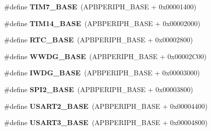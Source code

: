 \begin{DoxyCompactItemize}
\item 
\mbox{\label{group___peripheral__memory__map_ga0ebf54364c6a2be6eb19ded6b18b6387}} 
\#define {\bfseries T\+I\+M7\+\_\+\+B\+A\+SE}~(A\+P\+B\+P\+E\+R\+I\+P\+H\+\_\+\+B\+A\+SE + 0x00001400)
\item 
\mbox{\label{group___peripheral__memory__map_ga862855347d6e1d92730dfe17ee8e90b8}} 
\#define {\bfseries T\+I\+M14\+\_\+\+B\+A\+SE}~(A\+P\+B\+P\+E\+R\+I\+P\+H\+\_\+\+B\+A\+SE + 0x00002000)
\item 
\mbox{\label{group___peripheral__memory__map_ga4265e665d56225412e57a61d87417022}} 
\#define {\bfseries R\+T\+C\+\_\+\+B\+A\+SE}~(A\+P\+B\+P\+E\+R\+I\+P\+H\+\_\+\+B\+A\+SE + 0x00002800)
\item 
\mbox{\label{group___peripheral__memory__map_ga9a5bf4728ab93dea5b569f5b972cbe62}} 
\#define {\bfseries W\+W\+D\+G\+\_\+\+B\+A\+SE}~(A\+P\+B\+P\+E\+R\+I\+P\+H\+\_\+\+B\+A\+SE + 0x00002\+C00)
\item 
\mbox{\label{group___peripheral__memory__map_ga8543ee4997296af5536b007cd4748f55}} 
\#define {\bfseries I\+W\+D\+G\+\_\+\+B\+A\+SE}~(A\+P\+B\+P\+E\+R\+I\+P\+H\+\_\+\+B\+A\+SE + 0x00003000)
\item 
\mbox{\label{group___peripheral__memory__map_gac3e357b4c25106ed375fb1affab6bb86}} 
\#define {\bfseries S\+P\+I2\+\_\+\+B\+A\+SE}~(A\+P\+B\+P\+E\+R\+I\+P\+H\+\_\+\+B\+A\+SE + 0x00003800)
\item 
\mbox{\label{group___peripheral__memory__map_gade83162a04bca0b15b39018a8e8ec090}} 
\#define {\bfseries U\+S\+A\+R\+T2\+\_\+\+B\+A\+SE}~(A\+P\+B\+P\+E\+R\+I\+P\+H\+\_\+\+B\+A\+SE + 0x00004400)
\item 
\mbox{\label{group___peripheral__memory__map_gabe0d6539ac0026d598274ee7f45b0251}} 
\#define {\bfseries U\+S\+A\+R\+T3\+\_\+\+B\+A\+SE}~(A\+P\+B\+P\+E\+R\+I\+P\+H\+\_\+\+B\+A\+SE + 0x00004800)
\item 
\mbox{\label{group___peripheral__memory__map_gafa384bb1e7d610a806f7c1f1dbc72ac5}} 

\end{DoxyCompactItemize}
